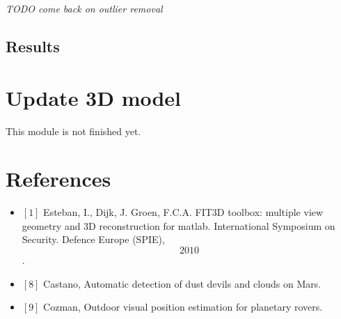 \documentclass[10pt]{article}
\begin{document}
\textit{TODO come back on outlier removal}
\subsection{Results}

\section{Update 3D model}
This module is not finished yet.


\section{References}
\begin{itemize}
\item $[1]$ 
Esteban, I., Dijk, J. Groen, F.C.A. FIT3D toolbox: multiple view geometry and
3D reconstruction for matlab. International Symposium on Security. Defence
Europe (SPIE), \[2010\].
\item $[8]$ Castano, Automatic detection of dust devils and clouds on Mars.
\item $[9]$ Cozman, Outdoor visual position estimation for planetary rovers.
\end{itemize}
\end{document}
